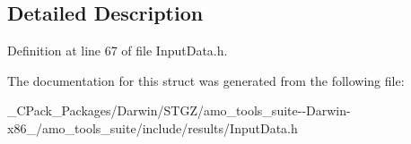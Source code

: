 \subsection{Detailed Description}


Definition at line 67 of file Input\+Data.\+h.



The documentation for this struct was generated from the following file\+:\begin{DoxyCompactItemize}
\item 
\+\_\+\+C\+Pack\+\_\+\+Packages/\+Darwin/\+S\+T\+G\+Z/amo\+\_\+tools\+\_\+suite-\/-\/\+Darwin-\/x86\+\_/amo\+\_\+tools\+\_\+suite/include/results/Input\+Data.\+h\end{DoxyCompactItemize}
